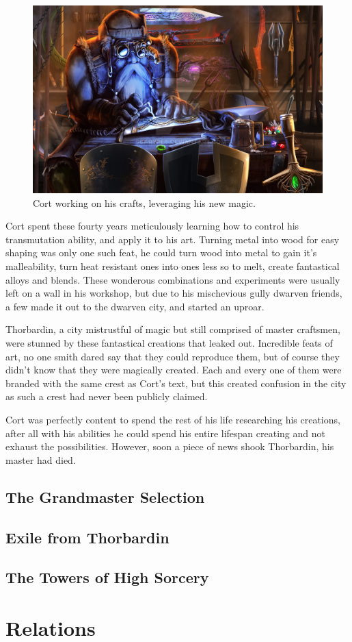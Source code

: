 \documentclass[12pt]{article}
\begin{document}
\begin{figure}[!htb]
  \centering
  \includegraphics[width=\textwidth]{./resources/arcaneshaper}
  \caption{Cort working on his crafts, leveraging his new magic.}
\end{figure}

Cort spent these fourty years meticulously learning how to control his
transmutation ability, and apply it to his art. Turning metal into wood for easy
shaping was only one such feat, he could turn wood into metal to gain it's
malleability, turn heat resistant ones into ones less so to melt, create
fantastical alloys and blends. These wonderous combinations and experiments were
usually left on a wall in his workshop, but due to his mischevious gully dwarven
friends, a few made it out to the dwarven city, and started an uproar. 

Thorbardin, a city mistrustful of magic but still comprised of master craftsmen,
were stunned by these fantastical creations that leaked out. Incredible feats of
art, no one smith dared say that they could reproduce them, but of course they
didn't know that they were magically created. Each and every one of them were
branded with the same crest as Cort's text, but this created confusion in the
city as such a crest had never been publicly claimed.

Cort was perfectly content to spend the rest of his life researching his
creations, after all with his abilities he could spend his entire lifespan
creating and not exhaust the possibilities. However, soon a piece of news shook
Thorbardin, his master had died.

\subsection{The Grandmaster Selection}



\subsection{Exile from Thorbardin}

\subsection{The Towers of High Sorcery}

\section{Relations}
\end{document}
